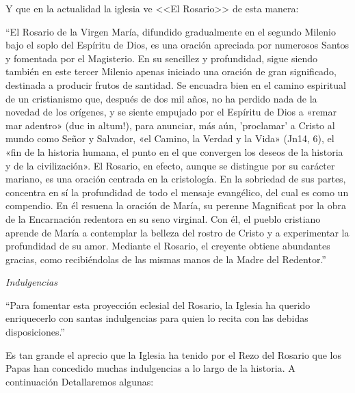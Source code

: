 \documentclass[12pt, letterpaper]{report}
\begin{document}
    \Large Y que en la actualidad la iglesia ve <<El Rosario>> de esta manera:
    
    \Large ``El Rosario de la Virgen María, difundido gradualmente en el segundo Milenio bajo el soplo del Espíritu de Dios, es una oración apreciada por numerosos Santos y fomentada por el Magisterio. En su sencillez y profundidad, sigue siendo también en este tercer Milenio apenas iniciado una oración de gran significado, destinada a producir frutos de santidad. Se encuadra bien en el camino espiritual de un cristianismo que, después de dos mil años, no ha perdido nada de la novedad de los orígenes, y se siente empujado por el Espíritu de Dios a «remar mar adentro» (duc in altum!), para anunciar, más aún, 'proclamar' a Cristo al mundo como Señor y Salvador, «el Camino, la Verdad y la Vida» (Jn14, 6), el «fin de la historia humana, el punto en el que convergen los deseos de la historia y de la civilización». El Rosario, en efecto, aunque se distingue por su carácter mariano, es una oración centrada en la cristología. En la sobriedad de sus partes, concentra en sí la profundidad de todo el mensaje evangélico, del cual es como un compendio. En él resuena la oración de María, su perenne Magnificat por la obra de la Encarnación redentora en su seno virginal. Con él, el pueblo cristiano aprende de María a contemplar la belleza del rostro de Cristo y a experimentar la profundidad de su amor. Mediante el Rosario, el creyente obtiene abundantes gracias, como recibiéndolas de las mismas manos de la Madre del Redentor.''\cite{Enciclica}
    
    \LARGE \textit{Indulgencias}
    
    \Large ``Para fomentar esta proyección eclesial del Rosario, la Iglesia ha querido enriquecerlo con santas indulgencias para quien lo recita con las debidas disposiciones.''\cite{Enciclica}
    
    Es tan grande el aprecio que la Iglesia ha tenido por el Rezo del Rosario que los Papas han concedido muchas indulgencias a lo largo de la historia. A continuación Detallaremos algunas:
\end{document}

